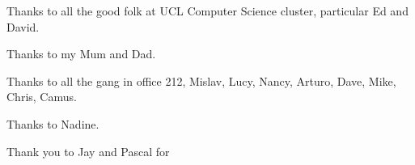 \begin{acknowledgements}
Thanks to all the good folk at UCL Computer Science cluster, particular Ed and David.

Thanks to my Mum and Dad. 

Thanks to all the gang in office 212, Mislav, Lucy, Nancy, Arturo, Dave, Mike, Chris, Camus. 

Thanks to Nadine. 

Thank you to Jay and Pascal for  
\end{acknowledgements}

\setcounter{tocdepth}{2} 

\tableofcontents

